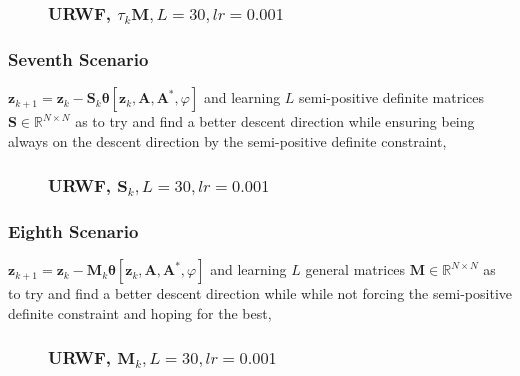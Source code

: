 \begin{frame}
  \begin{figure}
    \frametitle{URWF, $\tau_{k}\boldsymbol{M},L=30,lr=0.001$}
    \centering
    \resizebox{0.9\textwidth}{!}{}
    \label{fig:rwf_s_04_l_30_lr_0.001}
  \end{figure}
\end{frame}




\begin{frame}
  \frametitle{Seventh Scenario}
  \begin{center}
    $\boldsymbol{z}_{k+1} = \boldsymbol{z}_k - \boldsymbol{S}_k\boldsymbol{\theta}[\boldsymbol{z}_k,\boldsymbol{A},\boldsymbol{A^*},\varphi]$ 
    and learning $L$ semi-positive definite matrices $\boldsymbol{S}\in \mathbb{R}^{N \times N}$ as to try and find a better descent direction while 
    ensuring being always on the descent direction by the semi-positive definite constraint,
  \end{center}
  
\end{frame}

\begin{frame}
  \begin{figure}
    \frametitle{URWF, $\boldsymbol{S}_k,L=30,lr=0.001$}
    \centering
    \resizebox{0.9\textwidth}{!}{}
    \label{fig:rwf_s_07_l_30_lr_0.001}
  \end{figure}
\end{frame}


\begin{frame}
  \frametitle{Eighth Scenario}
  \begin{center}
    $\boldsymbol{z}_{k+1} = \boldsymbol{z}_k - \boldsymbol{M}_k\boldsymbol{\theta}[\boldsymbol{z}_k,\boldsymbol{A},\boldsymbol{A^*},\varphi]$ 
    and learning $L$ general matrices $\boldsymbol{M}\in \mathbb{R}^{N \times N}$ as to try and find a better descent direction while 
    while not forcing the semi-positive definite constraint and hoping for the best,
  \end{center}
\end{frame}

\begin{frame}
  \begin{figure}
    \frametitle{URWF, $\boldsymbol{M}_k,L=30,lr=0.001$}
    \centering
    \resizebox{0.9\textwidth}{!}{}
    \label{fig:rwf_s_06_l_30_lr_0.001}
  \end{figure}
\end{frame}
